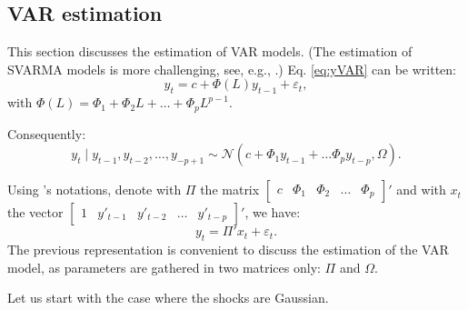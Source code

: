 \documentclass[
  12pt,
]{book}
\theoremstyle{definition}
\theoremstyle{definition}
\theoremstyle{definition}
\theoremstyle{definition}
\theoremstyle{remark}
\begin{document}
\hypertarget{estimVAR}{%
\subsection{VAR estimation}\label{estimVAR}}

This section discusses the estimation of VAR models. (The estimation of SVARMA models is more challenging, see, e.g., \citet{Gourieroux_Monfort_Renne_2020}.) Eq. \eqref{eq:yVAR} can be written:
\[
y_{t}=c+\Phi(L)y_{t-1}+\varepsilon_{t},
\]
with \(\Phi(L) = \Phi_1 + \Phi_2 L + \dots + \Phi_p L^{p-1}\).

Consequently:
\[
y_{t}\mid y_{t-1},y_{t-2},\ldots,y_{-p+1}\sim \mathcal{N}(c+\Phi_{1}y_{t-1}+\ldots\Phi_{p}y_{t-p},\Omega).
\]

Using \citet{Hamilton_1994}'s notations, denote with \(\Pi\) the matrix \(\left[\begin{array}{ccccc} c & \Phi_{1} & \Phi_{2} & \ldots & \Phi_{p}\end{array}\right]'\) and with \(x_{t}\) the vector \(\left[\begin{array}{ccccc} 1 & y'_{t-1} & y'_{t-2} & \ldots & y'_{t-p}\end{array}\right]'\), we have:
\begin{equation}
y_{t}= \Pi'x_{t} + \varepsilon_{t}. \label{eq:PIVAR}
\end{equation}
The previous representation is convenient to discuss the estimation of the VAR model, as parameters are gathered in two matrices only: \(\Pi\) and \(\Omega\).

Let us start with the case where the shocks are Gaussian.
\end{document}
